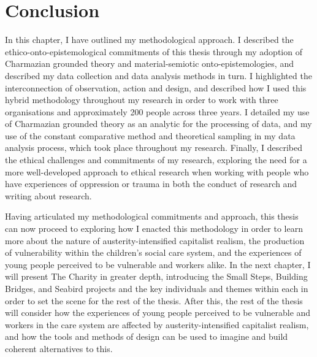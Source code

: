 \section{Conclusion}
\label{section:6-5-conc}
In this chapter, I have outlined my methodological approach. I described the ethico-onto-epistemological commitments of this thesis through my adoption of Charmazian grounded theory and material-semiotic onto-epistemologies, and described my data collection and data analysis methods in turn. I highlighted the interconnection of observation, action and design, and described how I used this hybrid methodology throughout my research in order to work with three organisations and approximately 200 people across three years. I detailed my use of Charmazian grounded theory as an analytic for the processing of data, and my use of the constant comparative method and theoretical sampling in my data analysis process, which took place throughout my research. Finally, I described the ethical challenges and commitments of my research, exploring the need for a more well-developed approach to ethical research when working with people who have experiences of oppression or trauma in both the conduct of research and writing about research.

Having articulated my methodological commitments and approach, this thesis can now proceed to exploring how I enacted this methodology in order to learn more about the nature of austerity-intensified capitalist realism, the production of vulnerability within the children's social care system, and the experiences of young people perceived to be vulnerable and workers alike. In the next chapter, I will present The Charity in greater depth, introducing the Small Steps, Building Bridges, and Seabird projects and the key individuals and themes within each in order to set the scene for the rest of the thesis. After this, the rest of the thesis will consider how the experiences of young people perceived to be vulnerable and workers in the care system are affected by austerity-intensified capitalist realism, and how the tools and methods of design can be used to imagine and build coherent alternatives to this.
